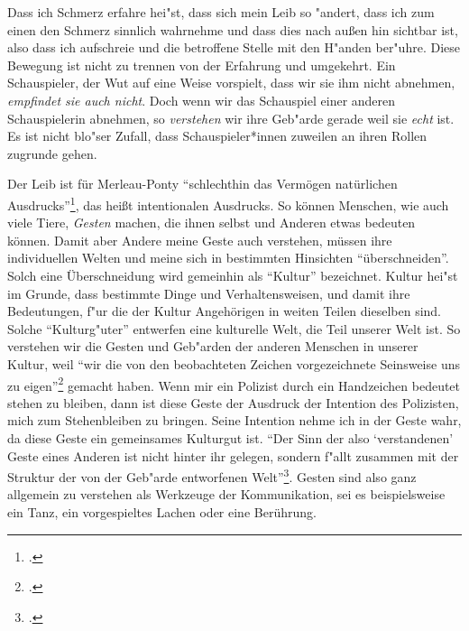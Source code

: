 \documentclass[a4paper, 12pt]{article}
\begin{document}
\begin{onehalfspace}
Dass ich Schmerz erfahre hei"st, dass sich mein Leib so "andert, dass ich zum einen den Schmerz sinnlich wahrnehme und dass dies nach außen hin sichtbar ist, also dass ich aufschreie und die betroffene Stelle mit den H"anden ber"uhre. Diese Bewegung ist nicht zu trennen von der Erfahrung und umgekehrt. Ein Schauspieler, der Wut auf eine Weise vorspielt, dass wir sie ihm nicht abnehmen, \emph{empfindet sie auch nicht}. Doch wenn wir das Schauspiel einer anderen Schauspielerin abnehmen, so \emph{verstehen} wir ihre Geb"arde gerade weil sie \emph{echt} ist. Es ist nicht blo"ser Zufall, dass Schauspieler*innen zuweilen an ihren Rollen zugrunde gehen. 

Der Leib ist für Merleau-Ponty "`schlechthin das Vermögen natürlichen Ausdrucks"'\footnote{\Cite[Siehe][S. 215]{merleau1966phanomenologie}.}, das heißt intentionalen Ausdrucks. So können Menschen, wie auch viele Tiere, \emph{Gesten} machen, die ihnen selbst und Anderen etwas bedeuten können. Damit aber Andere meine Geste auch verstehen, müssen ihre individuellen Welten und meine sich in bestimmten Hinsichten "`überschneiden"'. Solch eine Überschneidung wird gemeinhin als "`Kultur"' bezeichnet. Kultur hei"st im Grunde, dass bestimmte Dinge und Verhaltensweisen, und damit ihre Bedeutungen, f"ur die der Kultur Angehörigen in weiten Teilen dieselben sind. Solche "`Kulturg"uter"' entwerfen eine kulturelle Welt, die Teil unserer Welt ist. So verstehen wir die Gesten und Geb"arden der anderen Menschen in unserer Kultur, weil "`wir die von den beobachteten Zeichen vorgezeichnete Seinsweise uns zu eigen"'\footnote{\Cite[Siehe][S. 370]{merleau1966phanomenologie}.} gemacht haben. Wenn mir ein Polizist durch ein Handzeichen bedeutet stehen zu bleiben, dann ist diese Geste der Ausdruck der Intention des Polizisten, mich zum Stehenbleiben zu bringen. Seine Intention nehme ich in der Geste wahr, da diese Geste ein gemeinsames Kulturgut ist. "`Der Sinn der also `verstandenen' Geste eines Anderen ist nicht hinter ihr gelegen, sondern f"allt zusammen mit der Struktur der von der Geb"arde entworfenen Welt"'\footnote{\Cite[Siehe][S. 220]{merleau1966phanomenologie}.}. Gesten sind also ganz allgemein zu verstehen als Werkzeuge der Kommunikation, sei es beispielsweise ein Tanz, ein vorgespieltes Lachen oder eine Berührung.


\end{onehalfspace}
\end{document}
